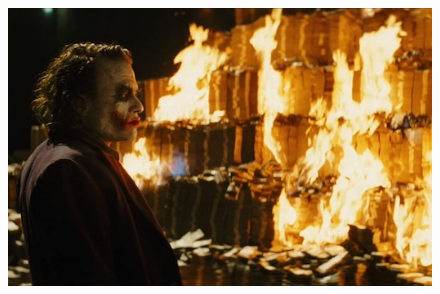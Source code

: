 \documentclass[xcolor=dvipsnames]{beamer}
\begin{document}
\begin{frame}
	\begin{figure}
	\begin{center}
 	\includegraphics[scale=0.65]{joker.jpg}
	\end{center}
	\end{figure}
\end{frame}
\end{document}
